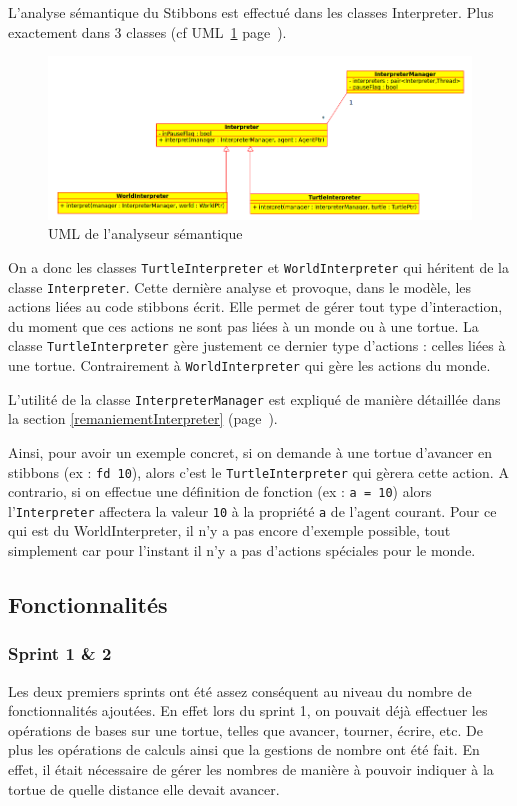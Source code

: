 L'analyse sémantique du Stibbons est effectué dans les classes Interpreter. Plus exactement dans 3 classes (cf UML~\ref{interpreterUML} page~\pageref{interpreterUML}).

\begin{figure}[h]
\caption{\label{interpreterUML} UML de l'analyseur sémantique}
\includegraphics[scale=0.5]{doc/report/uml/interpreterUML.png}
\end{figure}

On a donc les classes \verb|TurtleInterpreter| et \verb|WorldInterpreter| qui héritent de la classe \verb|Interpreter|. Cette dernière analyse et provoque, dans le modèle, les actions liées au code stibbons écrit. Elle permet de gérer tout type d'interaction, du moment que ces actions ne sont pas liées à un monde ou à une tortue. La classe \verb|TurtleInterpreter| gère justement ce dernier type d'actions : celles liées à une tortue. Contrairement à \verb|WorldInterpreter| qui gère les actions du monde.

L'utilité de la classe \verb|InterpreterManager| est expliqué de manière détaillée dans la section \ref{remaniementInterpreter} (page~\pageref{remaniementInterpreter}).

Ainsi, pour avoir un exemple concret, si on demande à une tortue d'avancer en stibbons (ex : \verb|fd 10|), alors c'est le \verb|TurtleInterpreter| qui gèrera cette action.
A contrario, si on effectue une définition de fonction (ex : \verb|a = 10|) alors l'\verb|Interpreter| affectera la valeur \verb|10| à la propriété \verb|a| de l'agent courant.
Pour ce qui est du WorldInterpreter, il n'y a pas encore d'exemple possible, tout simplement car pour l'instant il n'y a pas d'actions spéciales pour le monde.

\subsection{Fonctionnalités}

\subsubsection{Sprint 1 \& 2}
Les deux premiers sprints ont été assez conséquent au niveau du nombre de fonctionnalités ajoutées.
En effet lors du sprint 1, on pouvait déjà effectuer les opérations de bases sur une tortue, telles que avancer, tourner, écrire, etc. De plus les opérations de calculs ainsi que la gestions de nombre ont été fait. En effet, il était nécessaire de gérer les nombres de manière à pouvoir indiquer à la tortue de quelle distance elle devait avancer.

